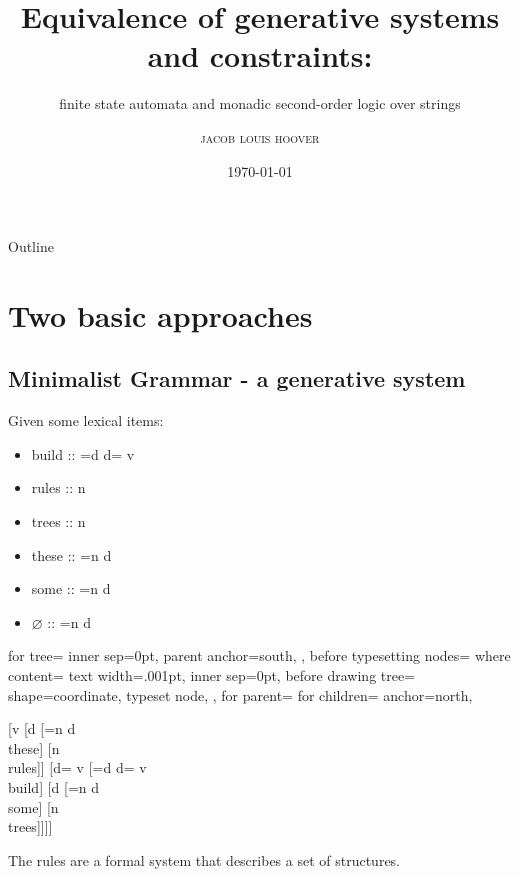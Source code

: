 \documentclass{beamer}
\title{Equivalence of generative systems and constraints:}
\subtitle{finite state automata and monadic second-order logic over strings}
\date{\today}
\author{\scshape{jacob louis hoover}}
\newcommand{\tree}[1]{
	\begin{forest}
		for tree={
		inner sep=0pt,
	    parent anchor=south,
	  },
	  before typesetting nodes={%
	    where content={}{%
	      text width=.001pt,
	      inner sep=0pt,
	      before drawing tree={%
	        shape=coordinate,
	        typeset node,
	      },
	      for parent={
	        for children={
	          anchor=north,
	        }
	      }
	    }{}
	  }
	  #1
	\end{forest}
}
\begin{document}
\maketitle

\begin{frame}{Outline}
\tableofcontents
\end{frame}

\section{Two basic approaches}%



\subsection{Minimalist Grammar - a generative system}

\begin{frame}
\begin{multicols}{2}
Given some lexical items:
\begin{itemize}
\item build :: =d d= v
\item rules :: n
\item trees :: n
\item these :: =n d
\item some  :: =n d
\item \emph{$\varnothing$} :: =n d
\end{itemize}
	\columnbreak
	\pause
	\tree{
		[v 
			[d 
				[{=n d\\these}] 
				[{n\\rules}]]
			[{d= v } 
				[{=d d= v\\build}]
				[d
					[{=n d\\some}]
					[{n\\trees}]]]]
	}
\end{multicols}

The rules are a formal system that describes a set of structures.
\end{frame}





\end{document}
